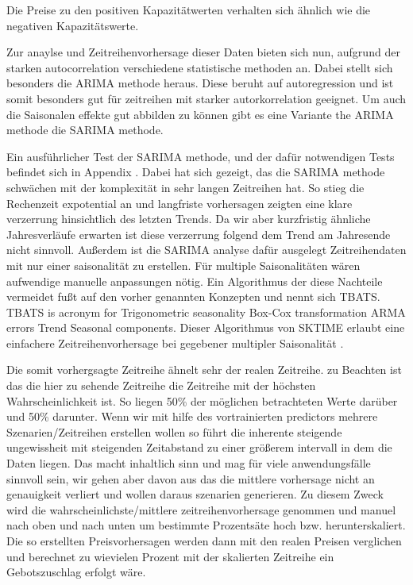 Die Preise zu den positiven Kapazitätwerten verhalten sich ähnlich wie die negativen Kapazitätswerte.

Zur anaylse und Zeitreihenvorhersage dieser Daten bieten sich nun, aufgrund der starken autocorrelation verschiedene statistische methoden an.
Dabei stellt sich besonders die ARIMA methode heraus. Diese beruht auf autoregression und ist somit besonders gut für zeitreihen mit starker
autorkorrelation geeignet. Um auch die Saisonalen effekte gut abbilden zu können gibt es eine Variante the ARIMA methode die SARIMA methode.

Ein ausführlicher Test der SARIMA methode, und der dafür notwendigen Tests befindet sich in Appendix . Dabei hat sich gezeigt, das die SARIMA methode schwächen mit der
komplexität in sehr langen Zeitreihen hat. So stieg die Rechenzeit expotential an und langfriste vorhersagen zeigten eine klare verzerrung hinsichtlich des letzten Trends.
Da wir aber kurzfristig ähnliche Jahresverläufe erwarten ist diese verzerrung folgend dem Trend am Jahresende nicht sinnvoll.
Außerdem ist die SARIMA analyse dafür ausgelegt Zeitreihendaten mit nur einer saisonalität zu erstellen. Für multiple Saisonalitäten wären aufwendige
manuelle anpassungen nötig. Ein Algorithmus der diese Nachteile vermeidet fußt auf den vorher genannten Konzepten und nennt sich TBATS.
TBATS is acronym for Trigonometric seasonality Box-Cox transformation ARMA errors Trend Seasonal components. Dieser Algorithmus von SKTIME erlaubt eine
einfachere Zeitreihenvorhersage bei gegebener multipler Saisonalität \cite{.05.04.2025}. 

Die somit vorhergsagte Zeitreihe ähnelt sehr der realen Zeitreihe. zu Beachten ist das die hier zu sehende Zeitreihe die Zeitreihe mit der höchsten Wahrscheinlichkeit ist.
So liegen 50\% der möglichen betrachteten Werte darüber und 50\% darunter. Wenn wir mit hilfe des vortrainierten predictors mehrere Szenarien/Zeitreihen
erstellen wollen so führt die inherente steigende ungewissheit mit steigenden Zeitabstand zu einer größerem intervall in dem die Daten liegen.
Das macht inhaltlich sinn und mag für viele anwendungsfälle sinnvoll sein, wir gehen aber davon aus das die mittlere vorhersage nicht an genauigkeit verliert
und wollen daraus szenarien generieren. Zu diesem Zweck wird die wahrscheinlichste/mittlere zeitreihenvorhersage genommen und manuel nach oben und nach unten
um bestimmte Prozentsäte hoch bzw. herunterskaliert. Die so erstellten Preisvorhersagen werden dann mit den realen Preisen verglichen und berechnet zu wievielen
Prozent mit der skalierten Zeitreihe ein Gebotszuschlag erfolgt wäre.


